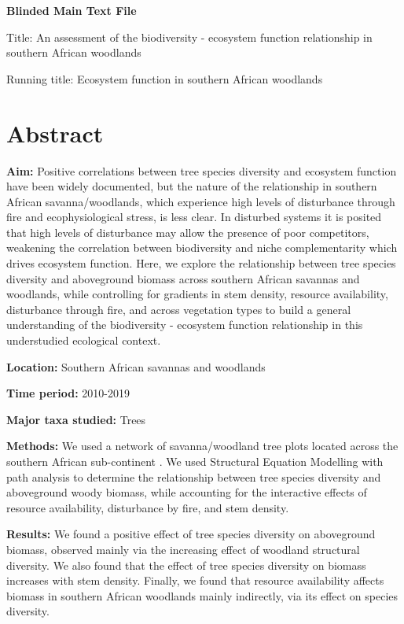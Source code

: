 \documentclass[11pt,a4paper]{article}
\begin{document}
\newpage{}

{\LARGE{\textbf{Blinded Main Text File}}}

\LARGE{Title: An assessment of the biodiversity - ecosystem function relationship in southern African woodlands}

\normalsize{Running title: Ecosystem function in southern African woodlands}

\section{Abstract}

\textbf{Aim:} Positive correlations between tree species diversity and ecosystem function have been widely documented, but the nature of the relationship in southern African savanna/woodlands, which experience high levels of disturbance through fire and ecophysiological stress, is less clear. In disturbed systems it is posited that high levels of disturbance may allow the presence of poor competitors, weakening the correlation between biodiversity and niche complementarity which drives ecosystem function. Here, we explore the relationship between tree species diversity and aboveground biomass across southern African savannas and woodlands, while controlling for gradients in stem density, resource availability, disturbance through fire, and across vegetation types to build a general understanding of the biodiversity - ecosystem function relationship in this understudied ecological context.

\textbf{Location:} Southern African savannas and woodlands

\textbf{Time period:} 2010-2019

\textbf{Major taxa studied:} Trees

\textbf{Methods:} We used a network of \nplots{} savanna/woodland tree plots located across the southern African sub-continent . We used Structural Equation Modelling with path analysis to determine the relationship between tree species diversity and aboveground woody biomass, while accounting for the interactive effects of resource availability, disturbance by fire, and stem density.

\textbf{Results:} We found a positive effect of tree species diversity on aboveground biomass, observed mainly via the increasing effect of woodland structural diversity. We also found that the effect of tree species diversity on biomass increases with stem density. Finally, we found that resource availability affects biomass in southern African woodlands mainly indirectly, via its effect on species diversity.
\end{document}
